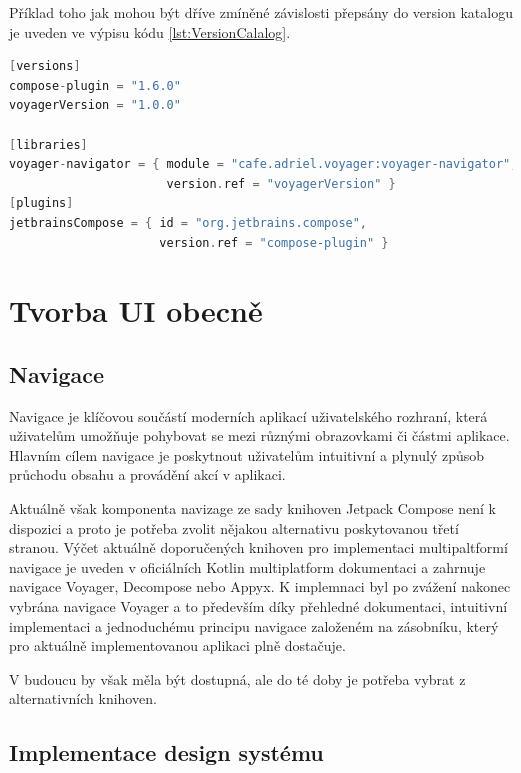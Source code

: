 Příklad toho jak mohou být dříve zmíněné závislosti přepsány do version
katalogu je uveden ve výpisu kódu \ref{lst:VersionCalalog}.

\begin{lstlisting}[caption={Version katalog}, label={lst:VersionCalalog}, language=Kotlin]
[versions]
compose-plugin = "1.6.0"
voyagerVersion = "1.0.0"

[libraries]
voyager-navigator = { module = "cafe.adriel.voyager:voyager-navigator", 
                      version.ref = "voyagerVersion" }
[plugins]
jetbrainsCompose = { id = "org.jetbrains.compose",
                     version.ref = "compose-plugin" }

\end{lstlisting}

\section{Tvorba UI obecně}
\subsection{Navigace}
Navigace je klíčovou součástí moderních aplikací uživatelského rozhraní, která uživatelům umožňuje pohybovat se mezi různými obrazovkami či 
částmi aplikace. Hlavním cílem navigace je poskytnout uživatelům intuitivní a plynulý způsob průchodu obsahu a provádění akcí v aplikaci. 

Aktuálně však komponenta navizage ze sady knihoven Jetpack Compose není k dispozici a proto je potřeba zvolit nějakou alternativu poskytovanou
třetí stranou. \cite{composeNav} Výčet aktuálně doporučených knihoven pro implementaci multipaltformí navigace je uveden v oficiálních Kotlin 
multiplatform dokumentaci a zahrnuje navigace Voyager, Decompose nebo Appyx. K implemnaci byl po zvážení nakonec vybrána navigace Voyager a 
to především díky přehledné dokumentaci, intuitivní implementaci a jednoduchému principu navigace založeném na zásobníku, který pro aktuálně
implementovanou aplikaci plně dostačuje.

V budoucu by však měla být dostupná, ale do té doby je potřeba vybrat z alternativních knihoven.



\subsection{Implementace design systému}

